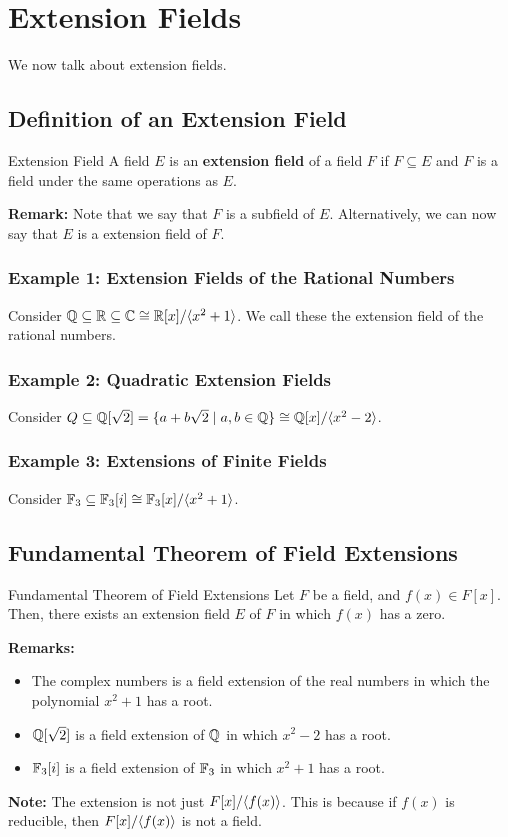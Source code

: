 \documentclass[letterpaper]{article}
\begin{document}
\section{Extension Fields}
We now talk about extension fields. 

\subsection{Definition of an Extension Field}
\begin{definition}{Extension Field}{}
    A field $E$ is an \textbf{extension field} of a field $F$ if $F \subseteq E$ and $F$ is a field under the same operations as $E$. 
\end{definition}
\textbf{Remark:} Note that we say that $F$ is a subfield of $E$. Alternatively, we can now say that $E$ is a extension field of $F$. 

\subsubsection{Example 1: Extension Fields of the Rational Numbers}
Consider $\mathbb{Q} \subseteq \mathbb{R} \subseteq \mathbb{C} \cong \mathbb{R}[x] / \langle x^2 + 1 \rangle$. We call these the extension field of the rational numbers. 

\subsubsection{Example 2: Quadratic Extension Fields}
Consider $Q \subseteq \mathbb{Q}[\sqrt{2}] = \{a + b\sqrt{2} \mid a, b \in \mathbb{Q}\} \cong \mathbb{Q}[x] / \langle x^2 - 2 \rangle$.

\subsubsection{Example 3: Extensions of Finite Fields}
Consider $\mathbb{F}_{3} \subseteq \mathbb{F}_{3}[i] \cong \mathbb{F}_{3}[x] / \langle x^2 + 1 \rangle$. 

\subsection{Fundamental Theorem of Field Extensions}
\begin{theorem}{Fundamental Theorem  of Field Extensions}{}
    Let $F$ be a field, and $f(x) \in F[x]$. Then, there exists an extension field $E$ of $F$ in which $f(x)$ has a zero. 
\end{theorem}
\textbf{Remarks:}
\begin{itemize}
    \item The complex numbers is a field extension of the real numbers in which the polynomial $x^2 + 1$ has a root. 
    \item $\mathbb{Q}[\sqrt{2}]$ is a field extension of $\mathbb{Q}$ in which $x^2 - 2$ has a root. 
    \item $\mathbb{F}_{3}[i]$ is a field extension of $\mathbb{F}_3$ in which $x^2 + 1$ has a root. 
\end{itemize}
\textbf{Note:} The extension is not just $F[x] / \langle f(x) \rangle$. This is because if $f(x)$ is reducible, then $F[x] / \langle f(x) \rangle$ is not a field.
\end{document}
